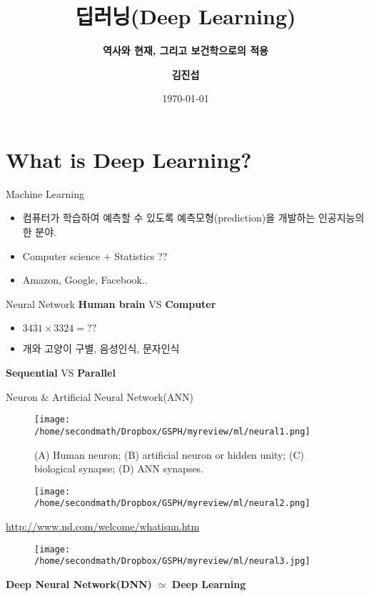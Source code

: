 \documentclass{beamer}
\begin{document}
\title{ \textbf{딥러닝(Deep Learning)} }
\subtitle{\textbf{역사와 현재, 그리고 보건학으로의 적용}}
\author{\textbf{김진섭}}
\date{\today}
\begin{frame}
\titlepage
\end{frame}

\section{\protect\textbf{What is Deep Learning?}}
\begin{frame}{Machine Learning}
\begin{itemize}
\item 컴퓨터가 학습하여 예측할 수 있도록 예측모형(prediction)을 개발하는 인공지능의 한 분야.
\item Computer science + Statistics ??
\item Amazon, Google, Facebook..
\end{itemize}
\end{frame}


\begin{frame}{Neural Network}
\textbf{Human brain} VS \textbf{Computer}
\begin{itemize}
\item $3431 \times 3324 = ?? $
\item 개와 고양이 구별, 음성인식, 문자인식  
\end{itemize}
\textbf{Sequential} VS \textbf{Parallel} 
\end{frame}

\begin{frame}{Neuron \& Artificial Neural Network(ANN)\citep{maltarollo2013applications}}
\begin{figure}
\texttt{[image: /home/secondmath/Dropbox/GSPH/myreview/ml/neural1.png]}
\caption{(A) Human neuron; (B) artificial neuron or hidden unity; (C) biological synapse; (D) ANN synapses.}
\end{figure}
\end{frame}

\begin{frame}
\begin{figure}
\texttt{[image: /home/secondmath/Dropbox/GSPH/myreview/ml/neural2.png]}
\end{figure}
\url{http://www.nd.com/welcome/whatisnn.htm}
\end{frame}

\begin{frame}
\begin{figure}
\texttt{[image: /home/secondmath/Dropbox/GSPH/myreview/ml/neural3.jpg]}
\end{figure}
\textbf{Deep Neural Network(DNN)} $\simeq$ \textbf{Deep Learning}
\end{frame}
\end{document}
